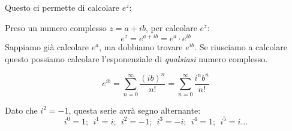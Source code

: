 Questo ci permette di calcolare $e^z$:

Preso un numero complesso $z=a+ib$, per calcolare $e^z$:
\begin{equation}
  e^z=e^{a+ib}=e^a\cdot e^{ib}
\end{equation}
Sappiamo già calcolare $e^a$, ma dobbiamo trovare $e^{ib}$. Se riusciamo a calcolare questo possiamo calcolare l'esponenziale di \textit{qualsiasi} numero complesso.

\begin{definizione}
\begin{equation}
  e^{ib}=\sum_{n=0}^{\infty}\frac{(ib)^n}{n!}=\sum_{n=0}^{\infty}\frac{i^nb^n}{n!}
  \label{eq:e^i}
\end{equation}
\end{definizione}
Dato che $i^2=-1$, questa serie avrà segno alternante:
\begin{equation}
  i^0=1;\ \ i^1=i;\ \ i^2=-1;\ \ i^3=-i;\ \ i^4=1;\ \ i^5=i...
\end{equation}
\begin{proprietà}
  
\end{proprietà}




